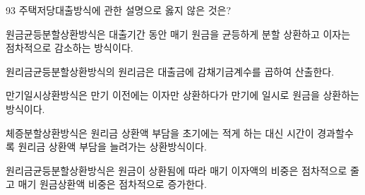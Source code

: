 \begin{question}{93}
주택저당대출방식에 관한 설명으로 옳지 않은 것은?
\begin{choices}
  \item 원금균등분할상환방식은 대출기간 동안 매기 원금을 균등하게 분할 상환하고 이자는 점차적으로 감소하는 방식이다.
  \item 원리금균등분할상환방식의 원리금은 대출금에 감채기금계수를 곱하여 산출한다.
  \item 만기일시상환방식은 만기 이전에는 이자만 상환하다가 만기에 일시로 원금을 상환하는 방식이다.
  \item 체증분할상환방식은 원리금 상환액 부담을 초기에는 적게 하는 대신 시간이 경과할수록 원리금 상환액 부담을 늘려가는 상환방식이다.
  \item 원리금균등분할상환방식은 원금이 상환됨에 따라 매기 이자액의 비중은 점차적으로 줄고 매기 원금상환액 비중은 점차적으로 증가한다.
\end{choices}
\end{question}
